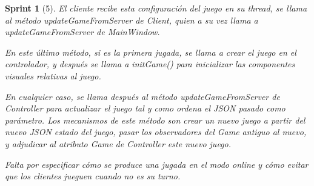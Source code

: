 \documentclass[12pt,a4paper,openright]{book}
\theoremstyle{break}
\newtheorem*{sprint}{Sprint}
\begin{document}
\begin{sprint}[5]
El cliente recibe esta configuración del juego en su thread, se llama al método updateGameFromServer de Client, quien a su vez llama a updateGameFromServer de MainWindow.

En este último método, si es la primera jugada, se llama a crear el juego en el controlador, y después se llama a initGame() para inicializar las componentes visuales relativas al juego.

En cualquier caso, se llama después al método updateGameFromServer de Controller para actualizar el juego tal y como ordena el JSON pasado como parámetro. Los mecanismos de este método son crear un nuevo juego a partir del nuevo JSON estado del juego, pasar los observadores del Game antiguo al nuevo, y adjudicar al atributo Game de Controller este nuevo juego.

Falta por especificar cómo se produce una jugada en el modo online y cómo evitar que los clientes jueguen cuando no es su turno.


\end{sprint}
\end{document}
